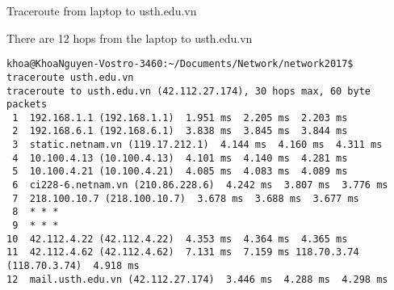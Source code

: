 \documentclass{report}
\begin{document}
\begin{section}{Traceroute from laptop to usth.edu.vn}

There are 12 hops from the laptop to usth.edu.vn

\begin{verbatim}
khoa@KhoaNguyen-Vostro-3460:~/Documents/Network/network2017$ traceroute usth.edu.vn
traceroute to usth.edu.vn (42.112.27.174), 30 hops max, 60 byte packets
 1  192.168.1.1 (192.168.1.1)  1.951 ms  2.205 ms  2.203 ms
 2  192.168.6.1 (192.168.6.1)  3.838 ms  3.845 ms  3.844 ms
 3  static.netnam.vn (119.17.212.1)  4.144 ms  4.160 ms  4.311 ms
 4  10.100.4.13 (10.100.4.13)  4.101 ms  4.140 ms  4.281 ms
 5  10.100.4.21 (10.100.4.21)  4.085 ms  4.083 ms  4.089 ms
 6  ci228-6.netnam.vn (210.86.228.6)  4.242 ms  3.807 ms  3.776 ms
 7  218.100.10.7 (218.100.10.7)  3.678 ms  3.688 ms  3.677 ms
 8  * * *
 9  * * *
10  42.112.4.22 (42.112.4.22)  4.353 ms  4.364 ms  4.365 ms
11  42.112.4.62 (42.112.4.62)  7.131 ms  7.159 ms 118.70.3.74 (118.70.3.74)  4.918 ms
12  mail.usth.edu.vn (42.112.27.174)  3.446 ms  4.288 ms  4.298 ms
\end{verbatim}
\end{section}
\end{document}
